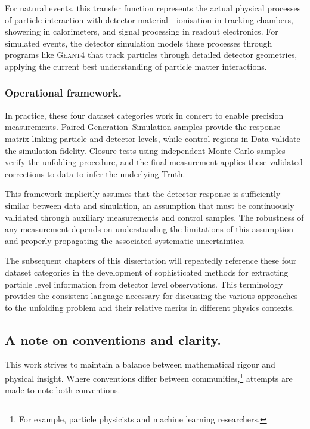 \begin{definition}
        For natural events, this transfer function represents the actual physical processes of particle interaction with detector material---ionisation in tracking chambers, showering in calorimeters, and signal processing in readout electronics.
        For simulated events, the detector simulation models these processes through programs like \textsc{Geant4} that track particles through detailed detector geometries, applying the current best understanding of particle matter interactions.

    \subsubsection{Operational framework.}
        In practice, these four dataset categories work in concert to enable precision measurements.
        Paired Generation--Simulation samples provide the response matrix linking particle and detector levels, while control regions in Data validate the simulation fidelity.
        Closure tests using independent Monte Carlo samples verify the unfolding procedure, and the final measurement applies these validated corrections to data to infer the underlying Truth.

        This framework implicitly assumes that the detector response is sufficiently similar between data and simulation, an assumption that must be continuously validated through auxiliary measurements and control samples.
        The robustness of any measurement depends on understanding the limitations of this assumption and properly propagating the associated systematic uncertainties.

        The subsequent chapters of this dissertation will repeatedly reference these four dataset categories in the development of sophisticated methods for extracting particle level information from detector level observations.
        This terminology provides the consistent language necessary for discussing the various approaches to the unfolding problem and their relative merits in different physics contexts.      
    \subsection{A note on conventions and clarity.}
         This work strives to maintain a balance between mathematical rigour and physical insight.
         Where conventions differ between communities,\footnote{For example, particle physicists and machine learning researchers.} attempts are made to note both conventions.
         

\end{definition}
